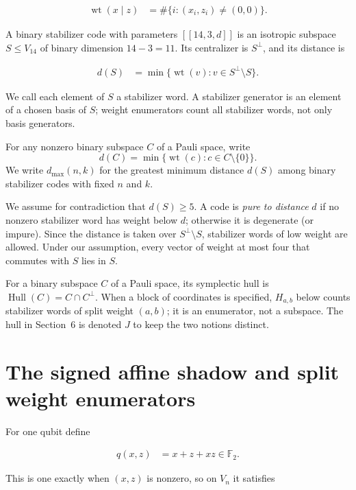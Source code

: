 \documentclass[11pt]{article}
\begin{document}
\[
\begin{aligned}
\operatorname{wt}(x\mid z) &=\#\{i : (x_{i},z_{i}) \ne (0,0)\}.
\end{aligned}
\]

A binary stabilizer code with parameters \(\left[\!\left[14,3,d\right]\!\right]\) is an isotropic subspace \(S \leq V_{14}\) of binary dimension \(14-3=11\). Its centralizer is \(S^\perp\), and its distance is

\[
\begin{aligned}
d(S) &=\min \{ \operatorname{wt}(v) : v \in S^\perp \setminus S \}.
\end{aligned}
\]

We call each element of \(S\) a stabilizer word. A stabilizer generator is an element of a chosen basis of \(S\); weight enumerators count all stabilizer words, not only basis generators.

For any nonzero binary subspace \(C\) of a Pauli space, write
\[
d(C)=\min\{\operatorname{wt}(c):c\in C\setminus\{0\}\}.
\]
We write \(d_{\max}(n,k)\) for the greatest minimum distance \(d(S)\) among binary stabilizer codes with fixed \(n\) and \(k\).

We assume for contradiction that \(d(S) \geq 5\). A code is \emph{pure to distance} \(d\) if no nonzero stabilizer word has weight below \(d\); otherwise it is degenerate (or impure). Since the distance is taken over \(S^\perp\setminus S\), stabilizer words of low weight are allowed. Under our assumption, every vector of weight at most four that commutes with \(S\) lies in \(S\).

For a binary subspace \(C\) of a Pauli space, its symplectic hull is \(\operatorname{Hull}(C)=C \cap C^\perp\). When a block of coordinates is specified, \(H_{a,b}\) below counts stabilizer words of split weight \((a,b)\); it is an enumerator, not a subspace. The hull in Section~6 is denoted \(J\) to keep the two notions distinct.

\section{The signed affine shadow and split weight enumerators}\label{the-signed-affine-shadow-including-split-weights}

For one qubit define

\[
\begin{aligned}
q(x,z) &=x + z + xz \in \mathbb{F}_{2}.
\end{aligned}
\]

This is one exactly when \((x,z)\) is nonzero, so on \(V_{n}\) it satisfies
\end{document}

